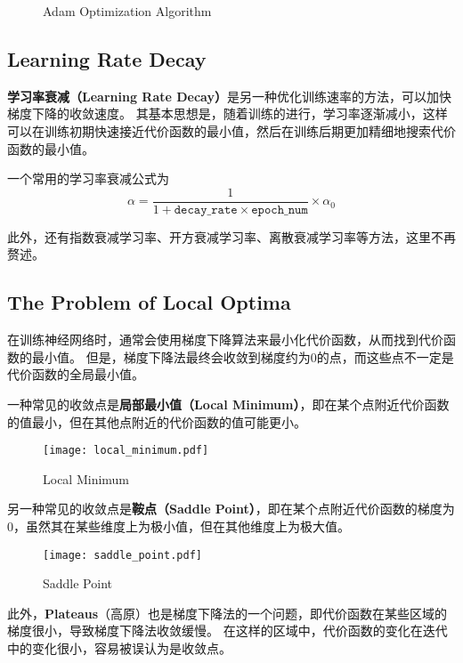 \begin{figure}[h!bt]
    \centering
    \centering
    \caption{Adam Optimization Algorithm}
    \label{fig:adam}
\end{figure}

\subsection{Learning Rate Decay}

\textbf{学习率衰减（Learning Rate Decay）}是另一种优化训练速率的方法，可以加快梯度下降的收敛速度。
其基本思想是，随着训练的进行，学习率逐渐减小，这样可以在训练初期快速接近代价函数的最小值，然后在训练后期更加精细地搜索代价函数的最小值。

一个常用的学习率衰减公式为
\begin{equation}
    \alpha = \frac{1}{1 + \mathtt{decay\_rate} \times \mathtt{epoch\_num}} \times \alpha_0
\end{equation}

此外，还有指数衰减学习率、开方衰减学习率、离散衰减学习率等方法，这里不再赘述。

\subsection{The Problem of Local Optima}

在训练神经网络时，通常会使用梯度下降算法来最小化代价函数，从而找到代价函数的最小值。
但是，梯度下降法最终会收敛到梯度约为0的点，而这些点不一定是代价函数的全局最小值。

一种常见的收敛点是\textbf{局部最小值（Local Minimum）}，即在某个点附近代价函数的值最小，但在其他点附近的代价函数的值可能更小。
\begin{figure}[h!bt]
    \centering
    \texttt{[image: local\_minimum.pdf]}
    \caption{Local Minimum}
    \label{fig:local_minimum}
\end{figure}

另一种常见的收敛点是\textbf{鞍点（Saddle Point）}，即在某个点附近代价函数的梯度为0，虽然其在某些维度上为极小值，但在其他维度上为极大值。
\begin{figure}[h!bt]
    \centering
    \texttt{[image: saddle\_point.pdf]}
    \caption{Saddle Point}
    \label{fig:saddle_point}
\end{figure}

此外，\textbf{Plateaus}（高原）也是梯度下降法的一个问题，即代价函数在某些区域的梯度很小，导致梯度下降法收敛缓慢。
在这样的区域中，代价函数的变化在迭代中的变化很小，容易被误认为是收敛点。
